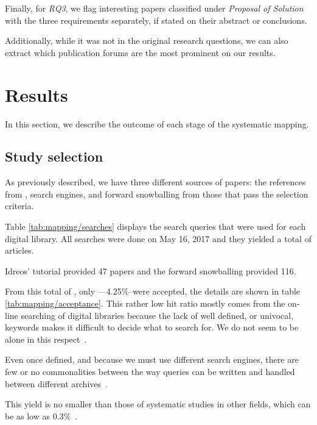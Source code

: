 Finally, for \emph{RQ3}, we flag interesting papers classified under
\emph{Proposal of Solution} with the three requirements separately, if stated
on their abstract or conclusions.

Additionally, while it was not in the original research questions, we can
also extract which publication forums are the most prominent on our results.

\section{Results}
\label{sec:mapping/results}
In this section, we describe the outcome of each stage of the systematic mapping.

\subsection{Study selection}
As previously described, we have three different sources of papers:
the references from \cite{Idreos2015}, search engines, and forward snowballing
from those that pass the selection criteria.

Table \ref{tab:mapping/searches} displays the search queries that were used for
each digital library.
All searches were done on May 16, 2017 and they yielded a total of  articles.

Idreos' tutorial provided 47 papers and the forward snowballing provided 116.

From this total of , only ---4.25\%--were accepted, the details are
shown in table \ref{tab:mapping/acceptance}. This rather low hit ratio
mostly comes from the on-line searching of digital libraries
because the lack of well defined, or univocal, keywords makes it difficult to decide what
to search for. We do not seem to be alone in this respect~\cite{Kitchenham2013,Jorgensen2007}.

Even once defined, and because we must use different search engines, there are
few or no commonalities between the way queries can be written and handled
between different archives~\cite{Bailey2007, Brereton2007}.

This yield is no smaller than those of systematic studies in
other fields, which can be as low as 0.3\%~\cite{Oakley2003}.

